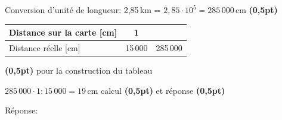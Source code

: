 \begin{parts}
\vspace{10pt}{\footnotesize\raggedleft Espace pour ta démarche et tes calculs\par}
\begin{solutionorgrid}[190pt]

\vspace{5pt}
Conversion d'unité de longueur: 2,85\,km = $2,85 \cdot 10^{5} = 285\,000$\,cm \hfill\textbf{(0,5pt)}

\vspace{5pt}
\def\arraystretch{1.5}
\begin{tabularx}{0.6\textwidth}{l|C|C|}
Distance sur la carte [cm]&1&\\
\hline
Distance réelle [cm]&15\,000&285\,000\\
\end{tabularx}
\def\arraystretch{1}

\hfill\textbf{(0,5pt)} pour la construction du tableau

\vspace{15pt}$285\,000 \cdot 1 : 15\,000 = 19$\,cm \hfill calcul \textbf{(0,5pt)} et réponse \textbf{(0,5pt)}
\end{solutionorgrid}

\begin{tcolorbox}[enhanced jigsaw, interior hidden, colframe=box, parbox=false]%
Réponse: 
\end{tcolorbox}
\end{parts}


